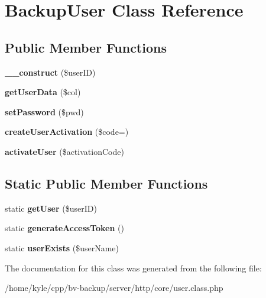 \hypertarget{class_backup_user}{}\section{Backup\+User Class Reference}
\label{class_backup_user}
\subsection*{Public Member Functions}
\begin{DoxyCompactItemize}
\item 
\mbox{\label{class_backup_user_aee2c42d1e5f3fc18d58d7ce20b04ff69}} 
{\bfseries \+\_\+\+\_\+construct} (\$user\+ID)
\item 
\mbox{\label{class_backup_user_af2e762eb04d550cb9ddf2211c5770103}} 
{\bfseries get\+User\+Data} (\$col)
\item 
\mbox{\label{class_backup_user_a4b51fb52e703fafdee12f67a265ec019}} 
{\bfseries set\+Password} (\$pwd)
\item 
\mbox{\label{class_backup_user_a5b637dd4f8c1621ff2be46ac3e7f6bf9}} 
{\bfseries create\+User\+Activation} (\$code=\textquotesingle{}\textquotesingle{})
\item 
\mbox{\label{class_backup_user_a980f26c158e68188e940cc3c7f29c1f3}} 
{\bfseries activate\+User} (\$activation\+Code)
\end{DoxyCompactItemize}
\subsection*{Static Public Member Functions}
\begin{DoxyCompactItemize}
\item 
\mbox{\label{class_backup_user_a955a6e50598ece7d2a5bdf6f41bfbae4}} 
static {\bfseries get\+User} (\$user\+ID)
\item 
\mbox{\label{class_backup_user_a816d22afa5eb3ef679d9e522eb5bc4c3}} 
static {\bfseries generate\+Access\+Token} ()
\item 
\mbox{\label{class_backup_user_a4366d21e76920addcf9e92f4becb6701}} 
static {\bfseries user\+Exists} (\$user\+Name)
\end{DoxyCompactItemize}


The documentation for this class was generated from the following file\+:\begin{DoxyCompactItemize}
\item 
/home/kyle/cpp/bv-\/backup/server/http/core/user.\+class.\+php\end{DoxyCompactItemize}
